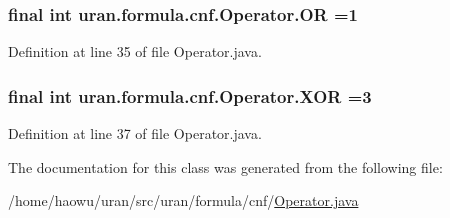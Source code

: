 \hypertarget{classuran_1_1formula_1_1cnf_1_1_operator_a7eeacb98b5e73c0caf9a889a7afcea42}{}
\subsubsection[{O\+R}]{\setlength{\rightskip}{0pt plus 5cm}final int uran.\+formula.\+cnf.\+Operator.\+O\+R =1\hspace{0.3cm}{\ttfamily [static]}}\label{classuran_1_1formula_1_1cnf_1_1_operator_a7eeacb98b5e73c0caf9a889a7afcea42}


Definition at line 35 of file Operator.\+java.

\hypertarget{classuran_1_1formula_1_1cnf_1_1_operator_a0925040ebdb1c6b2ce586ec42212797a}{}
\subsubsection[{X\+O\+R}]{\setlength{\rightskip}{0pt plus 5cm}final int uran.\+formula.\+cnf.\+Operator.\+X\+O\+R =3\hspace{0.3cm}{\ttfamily [static]}}\label{classuran_1_1formula_1_1cnf_1_1_operator_a0925040ebdb1c6b2ce586ec42212797a}


Definition at line 37 of file Operator.\+java.



The documentation for this class was generated from the following file\+:\begin{DoxyCompactItemize}
\item 
/home/haowu/uran/src/uran/formula/cnf/\hyperlink{_operator_8java}{Operator.\+java}\end{DoxyCompactItemize}
